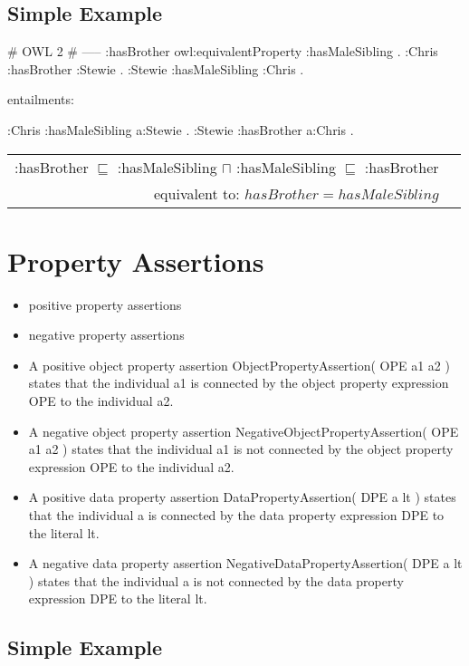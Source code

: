 \documentclass{llncs}
\newenvironment{DL}{
	\begin{center}
  \begin{tabular}{r l}

}{
  \end{tabular}
	\end{center}
}
\begin{document}
\subsection{Simple Example}

\begin{ex}
# OWL 2
# -----
:hasBrother owl:equivalentProperty :hasMaleSibling . 
:Chris :hasBrother :Stewie . 
:Stewie :hasMaleSibling :Chris .
\end{ex}

entailments:

\begin{ex}
:Chris :hasMaleSibling a:Stewie . 
:Stewie :hasBrother a:Chris .
\end{ex}

\begin{DL}
:hasBrother $\sqsubseteq$ :hasMaleSibling $\sqcap$ :hasMaleSibling $\sqsubseteq$ :hasBrother \\
equivalent to: $hasBrother = hasMaleSibling$
\end{DL}

\section{Property Assertions}



\begin{itemize}
	\item positive property assertions
  \item negative property assertions
	\item A positive object property assertion ObjectPropertyAssertion( OPE a1 a2 ) states that the individual a1 is connected by the object property expression OPE to the individual a2. 
	\item A negative object property assertion NegativeObjectPropertyAssertion( OPE a1 a2 ) states that the individual a1 is not connected by the object property expression OPE to the individual a2. 
	\item A positive data property assertion DataPropertyAssertion( DPE a lt ) states that the individual a is connected by the data property expression DPE to the literal lt. 
	\item A negative data property assertion NegativeDataPropertyAssertion( DPE a lt ) states that the individual a is not connected by the data property expression DPE to the literal lt.
\end{itemize}

\subsection{Simple Example}
\end{document}
